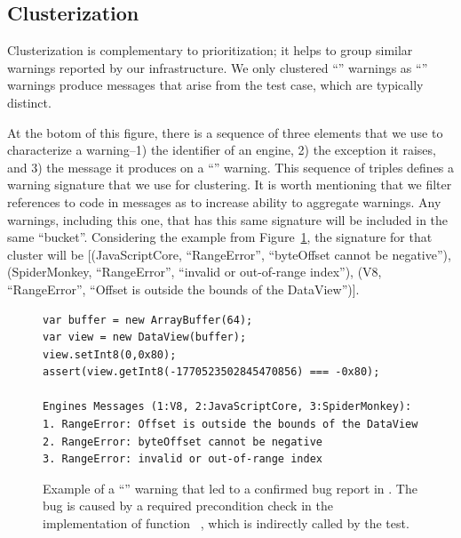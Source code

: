 \documentclass[smallextended]{svjour3}
\begin{document}
\subsection{Clusterization}
\label{sec:clusterization}


Clusterization is complementary to prioritization; it helps to group
similar warnings reported by our infrastructure. We only clustered
``\lo'' warnings as ``\hi'' warnings produce messages that arise from
the test case, which are typically distinct.

At the botom of this figure, there is a sequence of
three elements that we use to characterize a warning--1) the
identifier of an engine, 2) the exception it raises, and 3) the
message it produces on a ``\lo'' warning.  This sequence of triples
defines a warning signature that we use for clustering. It is worth
mentioning that we filter references to code in messages as to
increase ability to aggregate warnings. Any warnings, including this
one, that has this same signature will be included in the same
``bucket''. Considering the example from
Figure~\ref{fig:lo-truepositive}, the signature for that cluster will
be [(JavaScriptCore, ``RangeError'', ``byteOffset cannot be
  negative''), (SpiderMonkey, ``RangeError'', ``invalid or
  out-of-range index''), (V8, ``RangeError'', ``Offset is outside the
  bounds of the DataView'')].

\begin{figure}[t!]
  \centering
  \begin{lstlisting}
var buffer = new ArrayBuffer(64);
var view = new DataView(buffer);
view.setInt8(0,0x80);
assert(view.getInt8(-1770523502845470856) === -0x80);

Engines Messages (1:V8, 2:JavaScriptCore, 3:SpiderMonkey):
1. RangeError: Offset is outside the bounds of the DataView
2. RangeError: byteOffset cannot be negative
3. RangeError: invalid or out-of-range index
  \end{lstlisting}
  \caption{\label{fig:lo-truepositive}Example of a ``\lo'' warning
    that led to a confirmed bug report in \chakra. The bug is caused
    by a required precondition check in the implementation of function
    ~\cite{ecmas262-getviewvalue}, which is indirectly called by the test. }
\end{figure}
\end{document}
